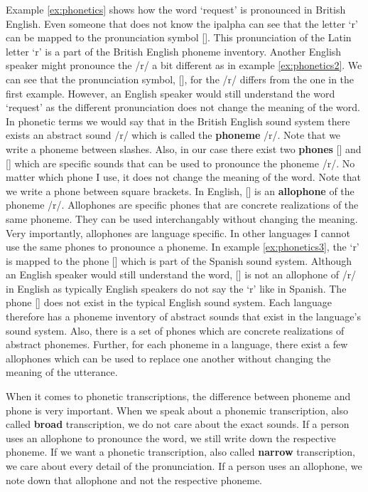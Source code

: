 Example \ref{ex:phonetics} shows how the word `request' is pronounced in British English. Even someone that does not know the \ac{ipalpha} can see that the letter `r' can be mapped to the pronunciation symbol []. This pronunciation of the Latin letter `r' is a part of the British English phoneme inventory. Another English speaker might pronounce the /r/ a bit different as in example \ref{ex:phonetics2}. We can see that the pronunciation symbol, [], for the /r/ differs from the one in the first example. However, an English speaker would still understand the word `request' as the different pronunciation does not change the meaning of the word. In phonetic terms we would say that in the British English sound system there exists an abstract sound /r/ which is called the \textbf{phoneme} /r/. Note that we write a phoneme between slashes. Also, in our case there exist two \textbf{phones} [] and [] which are specific sounds that can be used to pronounce the phoneme /r/. No matter which phone I use, it does not change the meaning of the word. Note that we write a phone between square brackets. In English, [] is an \textbf{allophone} of the phoneme /r/. Allophones are specific phones that are concrete realizations of the same phoneme. They can be used interchangably without changing the meaning. Very importantly, allophones are language specific. In other languages I cannot use the same phones to pronounce a phoneme. In example \ref{ex:phonetics3}, the `r' is mapped to the phone [] which is part of the Spanish sound system. Although an English speaker would still understand the word, [] is not an allophone of /r/ in English as typically English speakers do not say the `r' like in Spanish. The phone [] does not exist in the typical English sound system. Each language therefore has a phoneme inventory of abstract sounds that exist in the language's sound system. Also, there is a set of phones which are concrete realizations of abstract phonemes. Further, for each phoneme in a language, there exist a few allophones which can be used to replace one another without changing the meaning of the utterance.    

When it comes to phonetic transcriptions, the difference between phoneme and phone is very important. When we speak about a phonemic transcription, also called \textbf{broad} transcription, we do not care about the exact sounds. If a person uses an allophone to pronounce the word, we still write down the respective phoneme. If we want a phonetic transcription, also called \textbf{narrow} transcription, we care about every detail of the pronunciation. If a person uses an allophone, we note down that allophone and not the respective phoneme. 


